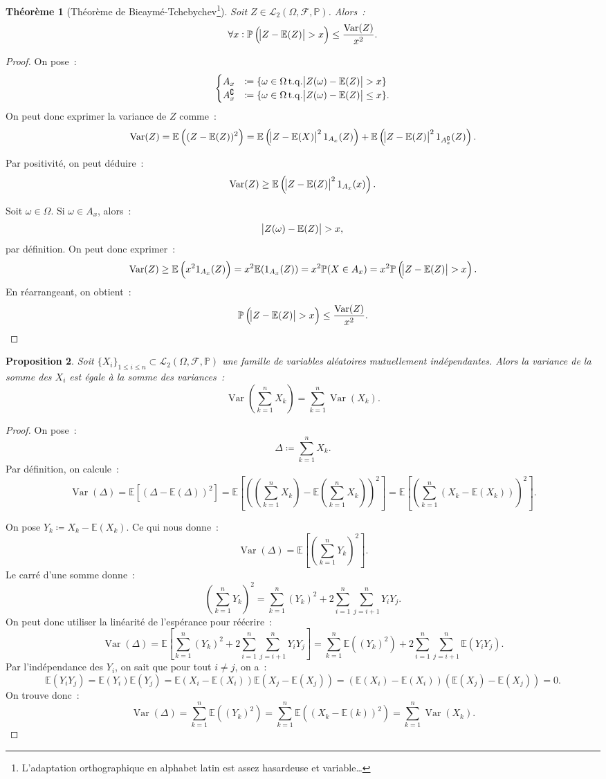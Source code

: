 \documentclass{article}
\newcommand{\E}{\mathbb E}
\renewcommand{\P}{\mathbb P}
\newcommand{\espproba}[3]{\left(#1, #2, #3\right)}  %
\newcommand{\Ofp}{\espproba \Omega{\mathcal F}\P}  %
\newcommand{\Ld}{\mathcal L_2\Ofp}  %
\DeclareMathOperator{\tq}{t.q.}
\DeclareMathOperator{\Var}{Var}
\newtheorem{thm}{Théorème}[section]
\newtheorem{prp}[thm]{Proposition}
\theoremstyle{definition}
\theoremstyle{remark}
\begin{document}
		\begin{thm}[Théorème de Bieaymé-Tchebychev\footnote{L'adaptation orthographique en alphabet latin est assez hasardeuse et variable\dots}] Soit $Z \in \Ld$.
		Alors~:
		\[\forall x : \P\left(\abs {Z-\E(Z)} > x\right) \leq \frac {\Var(Z)}{x^2}.\]
		\end{thm}

		\begin{proof} On pose~:
		\[\begin{cases}A_x &\coloneqq \{\omega \in \Omega \tq \abs {Z(\omega) - \E(Z)} > x\} \\
		A_x^\complement &\coloneqq \{\omega \in \Omega \tq \abs{Z(\omega) - \E(Z)} \leq x\}.\end{cases}\]
		On peut donc exprimer la variance de $Z$ comme~:
		\[\Var(Z) = \E\left((Z-\E(Z))^2\right) = \E\left(\abs {Z-\E(X)}^21_{A_x}(Z)\right) + \E\left(\abs{Z-\E(Z)}^21_{A_x^\complement}(Z)\right).\]

		Par positivité, on peut déduire~:
		\[\Var(Z) \geq \E\left(\abs{Z-\E(Z)}^21_{A_x}(x)\right).\]

		Soit $\omega \in \Omega$. Si $\omega \in A_x$, alors~:
		\[\abs {Z(\omega)-\E(Z)} > x,\]
		par définition. On peut donc exprimer~:
		\[\Var(Z) \geq \E\left(x^21_{A_x}(Z)\right) = x^2\E(1_{A_x}(Z)) = x^2\P(X \in A_x) = x^2\P\left(\abs {Z-\E(Z)} > x\right).\]
		En réarrangeant, on obtient~:
		\[\P\left(\abs {Z-\E(Z)} > x\right) \leq \frac {\Var(Z)}{x^2}.\]
		\end{proof}

		\begin{prp}\label{prp:varsomme=sommevar} Soit $\{X_i\}_{1 \leq i \leq n} \subset \Ld$ une famille de variables aléatoires mutuellement indépendantes.
		Alors la variance de la somme des $X_i$ est égale à la somme des variances~:
		\[\Var\left(\sum_{k=1}^nX_k\right) = \sum_{k=1}^n\Var(X_k).\]
		\end{prp}

		\begin{proof} On pose~:
		\[\Delta \coloneqq \sum_{k=1}^nX_k.\]
		Par définition, on calcule~:
		\[\Var(\Delta) = \E\left[\left(\Delta - \E(\Delta)\right)^2\right] = \E\left[\left(\left(\sum_{k=1}^nX_k\right) - \E\left(\sum_{k=1}^nX_k\right)\right)^2\right]
		= \E\left[\left(\sum_{k=1}^n\left(X_k - \E(X_k)\right)\right)^2\right].\]

		On pose $Y_k \coloneqq X_k - \E(X_k)$. Ce qui nous donne~:
		\[\Var(\Delta) = \E\left[\left(\sum_{k=1}^nY_k\right)^2\right].\]
		Le carré d'une somme donne~:
		\[\left(\sum_{k=1}^nY_k\right)^2 = \sum_{k=1}^n(Y_k)^2 + 2\sum_{i = 1}^n\sum_{j = i+1}^nY_iY_j.\]
		On peut donc utiliser la linéarité de l'espérance pour réécrire~:
		\[\Var(\Delta) = \E\left[\sum_{k=1}^n(Y_k)^2 + 2\sum_{i=1}^n\sum_{j=i+1}^nY_iY_j\right] = \sum_{k=1}^n\E\left((Y_k)^2\right) + 2\sum_{i=1}^n\sum_{j=i+1}^n\E(Y_iY_j).\]
		Par l'indépendance des $Y_i$, on sait que pour tout $i \neq j$, on a~:
		\[\E(Y_iY_j) = \E(Y_i)\E(Y_j) = \E(X_i-\E(X_i))\E(X_j-\E(X_j)) = \left(\E(X_i)-\E(X_i)\right)\left(\E(X_j)-\E(X_j)\right) = 0.\]
		On trouve donc~:
		\[\Var(\Delta) = \sum_{k=1}^n\E\left((Y_k)^2\right) = \sum_{k=1}^n\E\left((X_k-\E(k))^2\right) = \sum_{k=1}^n\Var(X_k).\]
		\end{proof}
\end{document}
